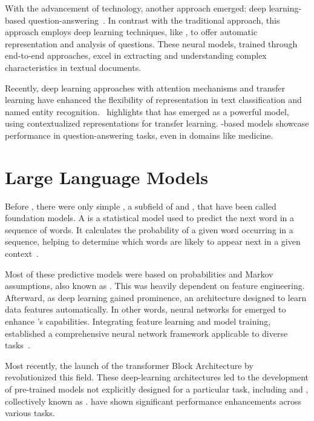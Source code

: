 With the advancement of technology, another approach emerged: deep learning-based question-answering~\cite{chizhik_challenges_2020}. In contrast with the traditional approach, this approach employs deep learning techniques, like {\rnn}, to offer automatic representation and analysis of questions. These neural models, trained through end-to-end approaches, excel in extracting and understanding complex characteristics in textual documents.

Recently, deep learning approaches with attention mechanisms and transfer learning have enhanced the flexibility of representation in text classification and named entity recognition.~\citet{zhong_building_2020} highlights {\bert} that has emerged as a powerful model, using contextualized representations for transfer learning. {\bert}-based models showcase performance in question-answering tasks, even in domains like medicine.



\section{Large Language Models}
\label{llm}

Before {\llm}, there were only simple {\lm}, a subfield of {\nlp} and {\ai}, that have been called foundation models. A {\lm} is a statistical model used to predict the next word in a sequence of words. It calculates the probability of a given word occurring in a sequence, helping to determine which words are likely to appear next in a given context~\cite{chang_language_2023}.

Most of these predictive models were based on probabilities and Markov assumptions, also known as {\slm}. This was heavily dependent on feature engineering. Afterward, as deep learning gained prominence, an architecture designed to learn data features automatically. In other words, neural networks for {\nlp} emerged to enhance {\lm}'s capabilities. Integrating feature learning and model training, {\nlm} established a comprehensive neural network framework applicable to diverse {\nlp} tasks~\cite{liu_prompting_nodate}.

Most recently, the launch of the transformer Block Architecture by~\citet{vaswani_attention_2023} revolutionized this field. These deep-learning architectures led to the development of pre-trained models not explicitly designed for a particular task, including {\bert} and {\gpt}, collectively known as {\plm}. {\plm} have shown significant performance enhancements across various {\nlp} tasks.

